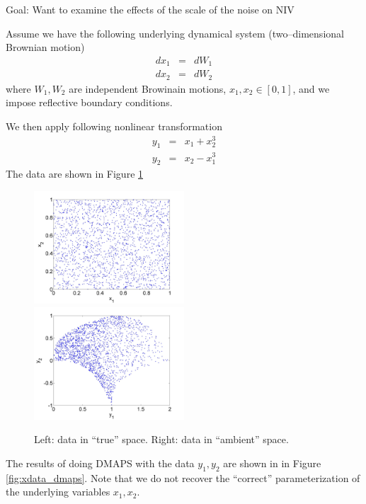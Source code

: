 \documentclass[12pt]{article}
\begin{document}
Goal: Want to examine the effects of the scale of the noise on NIV

Assume we have the following underlying dynamical system (two--dimensional Brownian motion)
\begin{eqnarray}
	dx_1 & = & dW_1 \\
	dx_2 & = & dW_2
\end{eqnarray}
where $W_1, W_2$ are independent Browinain motions, $x_1, x_2 \in [0, 1]$, and we impose reflective boundary conditions.

We then apply following nonlinear transformation
%
\begin{eqnarray}
y_1 & = & x_1 + x_2^3 \\
y_2 & = & x_2 - x_1^3
\end{eqnarray}
%
The data are shown in Figure \ref{fig:data}

\begin{figure}[htb]
\includegraphics[width=0.5\textwidth]{xdata}
\includegraphics[width=0.5\textwidth]{ydata}
\caption{Left: data in ``true'' space. Right: data in ``ambient'' space.}
\label{fig:data}
\end{figure}

The results of doing DMAPS with the data $y_1, y_2$ are shown in in Figure \ref{fig:xdata_dmaps}.
%
Note that we do not recover the ``correct'' parameterization of the underlying variables $x_1, x_2$.
\end{document}
